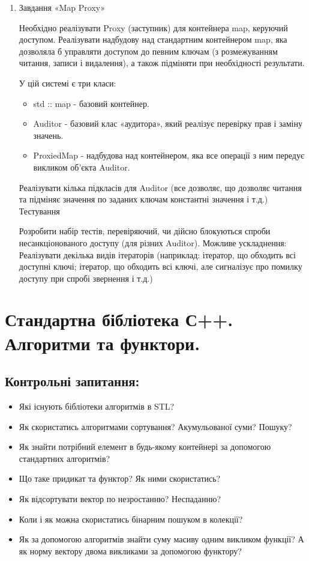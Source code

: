 \documentclass[a5paper,titlepage,openany,twoside,draft]{book_unv}%
\begin{document}
\begin{enumerate}
\item
Завдання «Map Proxy»

Необхідно реалізувати Proxy (заступник) для контейнера map, керуючий доступом.
Реалізувати надбудову над стандартним контейнером map, яка дозволяла б управляти доступом до певним ключам (з розмежуванням читання, записи і видалення), а також підміняти при необхідності результати.

У цій системі є три класи:
\begin{itemize}
\item
    std :: map - базовий контейнер.
\item
    Auditor - базовий клас «аудитора», який реалізує перевірку прав і заміну значень.
\item
    ProxiedMap - надбудова над контейнером, яка все операції з ним передує викликом об'єкта Auditor.
\end{itemize}
Реалізувати кілька підкласів для Auditor (все дозволяє, що дозволяє читання та підміняє значення по заданих ключам 
константні значення і т.д.)
Тестування

Розробити набір тестів, перевіряючий, чи дійсно блокуються спроби несанкціонованого доступу (для різних Auditor).
Можливе ускладнення:
Реалізувати декілька видів ітераторів (наприклад: ітератор, що обходить всі доступні ключі; 
ітератор, що обходить всі ключі, але сигналізує про помилку доступу при спробі звернення і т.д.) 



\end{enumerate}


\chapter{Стандартна бібліотека С++. Алгоритми та функтори.}
%

\section{Контрольні запитання:}
\begin{itemize}
\item
  Які існують бібліотеки алгоритмів в STL?
\item
  Як скористатись алгоритмами сортування? Акумульованої суми? Пошуку?
\item
  Як знайти потрібний елемент в будь-якому контейнері за допомогою
  стандартних алгоритмів?
\item
  Що таке придикат та функтор? Як ними скористатись?
\item
  Як відсортувати вектор по незростанню? Неспаданню?
\item
  Коли і як можна скористатись бінарним пошуком в колекції?
\item
  Як за допомогою алгоритмів знайти суму масиву одним викликом функції?
  А як норму вектору двома викликами за допомогою функтору?
\end{itemize}
\end{document}

